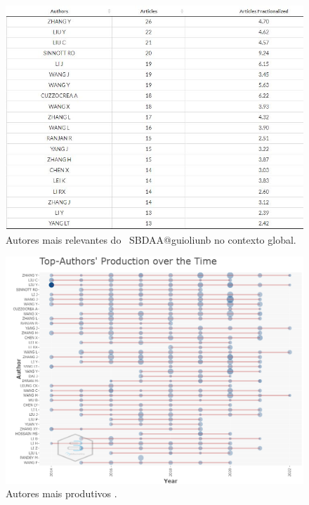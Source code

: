 \begin{figure}
    \centering
    \includegraphics[width=1\textwidth]{experiments/guioliunb/AnaliseBibliometrica/SocialBigDataAnalysis/most relevant authors.png}
    \caption{Autores mais relevantes do \dataset\ SBDAA@guioliunb no contexto global.}
    \label{fig:authors}
\end{figure}

\begin{figure}
    \centering
    \includegraphics[width=1\textwidth]{experiments/guioliunb/AnaliseBibliometrica/SocialBigDataAnalysis/PRODUCTION OVER THE TIME.png}
    \caption{Autores mais produtivos \dataset\SBDAA@guioliunb.}
    \label{fig:authors:production}
\end{figure}



